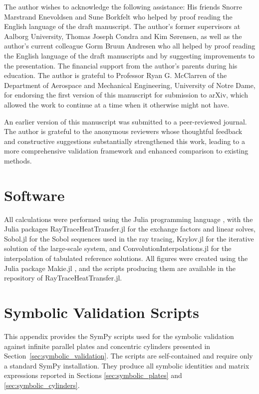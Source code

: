 \documentclass[preprint,1p,times]{elsarticle}
\theoremstyle{plain}
\theoremstyle{definition}
\theoremstyle{remark}
\begin{document}
The author wishes to acknowledge the following assistance: His friends Snorre Marstrand Enevoldsen and Sune Borkfelt who helped by proof reading the English language of the draft manuscript. The author's former supervisors at Aalborg University, Thomas Joseph Condra and Kim Sørensen, as well as the author's current colleague Gorm Bruun Andresen who all helped by proof reading the English language of the draft manuscripts and by suggesting improvements to the presentation. The financial support from the author's parents during his education. The author is grateful to Professor Ryan G. McClarren of the Department of Aerospace and Mechanical Engineering, University of Notre Dame, for endorsing the first version of this manuscript for submission to arXiv, which allowed the work to continue at a time when it otherwise might not have.

An earlier version of this manuscript was submitted to a peer-reviewed journal. The author is grateful to the anonymous reviewers whose thoughtful feedback and constructive suggestions substantially strengthened this work, leading to a more comprehensive validation framework and enhanced comparison to existing methods.

\section*{Software}

All calculations were performed using the Julia programming language \citep{Bezanson2017}, with the Julia packages RayTraceHeatTransfer.jl \citep{Bielefeld2024} for the exchange factors and linear solves, Sobol.jl \citep{JohnsonSobol} for the Sobol sequences used in the ray tracing, Krylov.jl \citep{Montoison2023} for the iterative solution of the large-scale system, and ConvolutionInterpolations.jl \citep{Bielefeld2025} for the interpolation of tabulated reference solutions. All figures were created using the Julia package Makie.jl \citep{DanischKrumbiegel2021}, and the scripts producing them are available in the repository of RayTraceHeatTransfer.jl.

\appendix

\section{Symbolic Validation Scripts}
\label{app:symbolic_scripts}

This appendix provides the SymPy \citep{SymPy2017} scripts used for the symbolic validation against infinite parallel plates and concentric cylinders presented in Section~\ref{sec:symbolic_validation}. The scripts are self-contained and require only a standard SymPy installation. They produce all symbolic identities and matrix expressions reported in Sections \ref{sec:symbolic_plates} and \ref{sec:symbolic_cylinders}.
\end{document}
